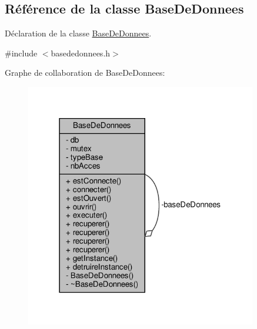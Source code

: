 \hypertarget{class_base_de_donnees}{}\subsection{Référence de la classe Base\+De\+Donnees}
\label{class_base_de_donnees}


Déclaration de la classe \hyperlink{class_base_de_donnees}{Base\+De\+Donnees}.  




{\ttfamily \#include $<$basededonnees.\+h$>$}



Graphe de collaboration de Base\+De\+Donnees\+:
\nopagebreak
\begin{figure}[H]
\begin{center}
\leavevmode
\includegraphics[width=286pt]{class_base_de_donnees__coll__graph}
\end{center}
\end{figure}
